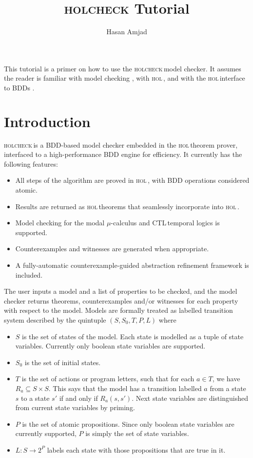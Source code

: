 \documentclass{article}
\newcommand{\ctl}{\textsf{CTL}\,}
\newcommand{\hc}{\textsc{holcheck\,}}
\newcommand{\hol}{\textsc{hol\,}}
\begin{document}
\title{\textsc{holcheck} Tutorial}
\author{Hasan Amjad}
\maketitle


This tutorial is a primer on how to use the \hc model checker. It assumes the reader is familiar with model checking \cite{Clarke1999}, with \hol \cite{HOL}, and with the \hol interface to BDDs \cite{Gordon2002}.

\section{Introduction}\label{sec:intro}

\hc is a BDD-based model checker embedded in the \hol theorem prover, interfaced to a high-performance BDD engine for efficiency. It currently has the following features:

\begin{itemize}
\item All steps of the algorithm are proved in \hol, with BDD operations considered atomic.
\item Results are returned as \hol theorems that seamlessly incorporate into \hol.
\item Model checking for the modal \(\mu\)-calculus and \ctl temporal logics is supported.
\item Counterexamples and witnesses are generated when appropriate.
\item A fully-automatic counterexample-guided abstraction refinement framework is included.  
\end{itemize}

The user inputs a model and a list of properties to be checked, and the model checker returns theorems, counterexamples and/or witnesses for each property with respect to the model. Models are formally treated as labelled transition system described by the quintuple \( (S, S_0, T, P, L) \) where 

\begin{itemize}
\item \( S \) is the set of states of the model. Each state is modelled as a tuple of state variables. Currently only boolean state variables are supported.
\item \( S_0\) is the set of initial states.
\item \( T \) is the set of actions or program letters, such that for each \( a \in T \), we have \( R_a \subseteq S \times S\). This says that the model has a transition labelled \( a \) from a state \( s \) to a state \( s' \) if and only if \( R_a(s,s') \). Next state variables are distinguished from current state variables by priming. 
\item \( P \) is the set of atomic propositions. Since only boolean state variables are currently supported, \( P \) is simply the set of state variables.
\item \( L:S\rightarrow 2^P \) labels each state with those propositions that are true in it.   
\end{itemize}
\end{document}
